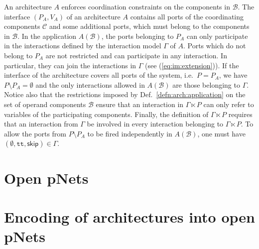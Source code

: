 \documentclass{llncs}
\newcommand{\defn}[1]{Def.~\ref{defn:#1}}
\newcommand{\eq}[1]{(\ref{eq:#1})}
\newcommand{\cB}{\ensuremath{\mathcal{B}}}
\newcommand{\cC}{\ensuremath{\mathcal{C}}}
\newcommand{\ie}[1][\ ]{i.e.#1}
\newcommand{\true} {\ensuremath{\mathtt{t\!t}}}
\newcommand{\noop} {\ensuremath{\mathsf{skip}}}
\newcommand{\IMextend}[2]{\ensuremath{#1 \ltimes #2}}
\begin{document}
An architecture $A$ enforces coordination constraints on the
components in $\cB$.  The interface $(P_A, V_A)$ of an
architecture $A$ contains all ports of the coordinating
components $\cC$ and some additional ports, which must belong to
the components in $\cB$.  In the application $A(\cB)$, the ports
belonging to $P_A$ can only participate in the interactions
defined by the interaction model $\Gamma$ of $A$.  Ports which do
not belong to $P_A$ are not restricted and can participate in any
interaction.  In particular, they can join the interactions in
$\Gamma$ (see \eq{im:extension}).  If the interface of the
architecture covers all ports of the system, \ie $P = P_A$, we
have $P\setminus P_A = \emptyset$ and the only interactions
allowed in $A(\cB)$ are those belonging to $\Gamma$.  Notice also
that the restrictions imposed by \defn{arch:application} on the
set of operand components $\cB$ ensure that an interaction in
$\IMextend{\Gamma}{P}$ can only refer to variables of the
participating components.
%
Finally, the definition of $\IMextend{\Gamma}{P}$ requires that
an interaction from $\Gamma$ be involved in every interaction
belonging to $\IMextend{\Gamma}{P}$.  To allow the ports from $P
\setminus P_A$ to be fired independently in $A(\cB)$, one must
have $(\emptyset, \true, \noop) \in \Gamma$.  

\begin{definition}
  \label{defn:arch:composition}
  
\end{definition}


\section{Open pNets}
\label{secn:pNets}


\section{Encoding of architectures into open pNets}
\label{secn:encoding}

\end{document}
